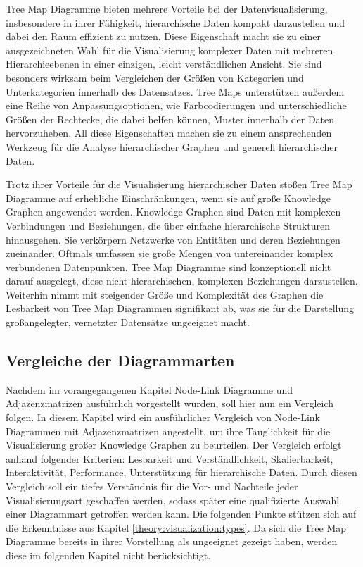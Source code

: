 Tree Map Diagramme bieten mehrere Vorteile bei der Datenvisualisierung, insbesondere in ihrer Fähigkeit, hierarchische Daten kompakt darzustellen und dabei den Raum effizient zu nutzen. Diese Eigenschaft macht sie zu einer ausgezeichneten Wahl für die Visualisierung komplexer Daten mit mehreren Hierarchieebenen in einer einzigen, leicht verständlichen Ansicht. Sie sind besonders wirksam beim Vergleichen der Größen von Kategorien und Unterkategorien innerhalb des Datensatzes. Tree Maps unterstützen außerdem eine Reihe von Anpassungsoptionen, wie Farbcodierungen und unterschiedliche Größen der Rechtecke, die dabei helfen können, Muster innerhalb der Daten hervorzuheben. All diese Eigenschaften machen sie zu einem ansprechenden Werkzeug für die Analyse hierarchischer Graphen und generell hierarchischer Daten.

Trotz ihrer Vorteile für die Visualisierung hierarchischer Daten stoßen Tree Map Diagramme auf erhebliche Einschränkungen, wenn sie auf große Knowledge Graphen angewendet werden. Knowledge Graphen sind Daten mit komplexen Verbindungen und Beziehungen, die über einfache hierarchische Strukturen hinausgehen. Sie verkörpern Netzwerke von Entitäten und deren Beziehungen zueinander. Oftmals umfassen sie große Mengen von untereinander komplex verbundenen Datenpunkten. Tree Map Diagramme sind konzeptionell nicht darauf ausgelegt, diese nicht-hierarchischen, komplexen Beziehungen darzustellen. Weiterhin nimmt mit steigender Größe und Komplexität des Graphen die Lesbarkeit von Tree Map Diagrammen signifikant ab, was sie für die Darstellung großangelegter, vernetzter Datensätze ungeeignet macht.

\subsection{Vergleiche der Diagrammarten}

Nachdem im vorangegangenen Kapitel Node-Link Diagramme und Adjazenzmatrizen ausführlich vorgestellt wurden, soll hier nun ein Vergleich folgen. In diesem Kapitel wird ein ausführlicher Vergleich von Node-Link Diagrammen mit Adjazenzmatrizen angestellt, um ihre Tauglichkeit für die Visualisierung großer Knowledge Graphen zu beurteilen. Der Vergleich erfolgt anhand folgender Kriterien: Lesbarkeit und Verständlichkeit, Skalierbarkeit, Interaktivität, Performance, Unterstützung für hierarchische Daten. Durch diesen Vergleich soll ein tiefes Verständnis für die Vor- und Nachteile jeder Visualisierungsart geschaffen werden, sodass später eine qualifizierte Auswahl einer Diagrammart getroffen werden kann. Die folgenden Punkte stützen sich auf die Erkenntnisse aus Kapitel \ref{theory:visualization:types}. Da sich die Tree Map Diagramme bereits in ihrer Vorstellung als ungeeignet gezeigt haben, werden diese im folgenden Kapitel nicht berücksichtigt.

